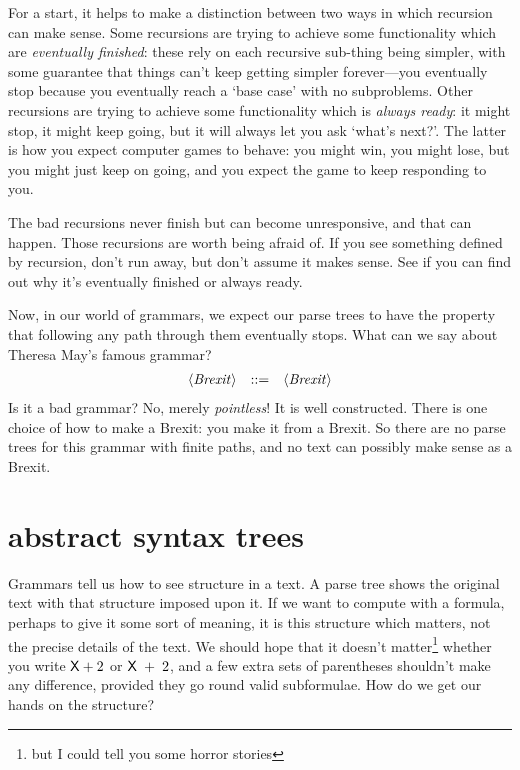 \documentclass{book}
\begin{document}
For a start, it helps to make a distinction between two ways in which recursion can make sense. Some recursions are trying to achieve some functionality which are \emph{eventually finished}: these rely on each recursive sub-thing being simpler, with some guarantee that things can't keep getting simpler forever---you eventually stop because you eventually reach a `base case' with no subproblems. Other recursions are trying to achieve some functionality which is \emph{always ready}: it might stop, it might keep going, but it will always let you ask `what's next?'. The latter is how you expect computer games to behave: you might win, you might lose, but you might just keep on going, and you expect the game to keep responding to you.

The bad recursions never finish but can become unresponsive, and that can happen. Those recursions are worth being afraid of. If you see something defined by recursion, don't run away, but don't assume it makes sense. See if you can find out why it's eventually finished or always ready.

Now, in our world of grammars, we expect our parse trees to have the property that following any path through them eventually stops. What can we say about Theresa May's famous grammar?
\[\begin{array}{rrl}
\langle\mathit{Brexit}\rangle & ::= & \langle\mathit{Brexit}\rangle
\end{array}\]
Is it a bad grammar? No, merely \emph{pointless}! It is well constructed. There is one choice of how to make a Brexit: you make it from a Brexit. So there are no parse trees for this grammar with finite paths, and no text can possibly make sense as a Brexit.


\section{abstract syntax trees}

\newcommand{\D}[1]{\mathtt{#1}}
\newcommand{\C}[1]{\mathtt{#1}}

Grammars tell us how to see structure in a text. A parse tree shows the original text with that structure imposed upon it. If we want to compute with a formula, perhaps to give it some sort of meaning, it is this structure which matters, not the precise details of the text. We should hope that it doesn't matter\footnote{but I could tell you some horror stories} whether you write $\mathsf{X}+2$ or $\mathsf{X}\;+\;2$, and a few extra sets of parentheses shouldn't make any difference, provided they go round valid subformulae. How do we get our hands on the structure?
\end{document}
